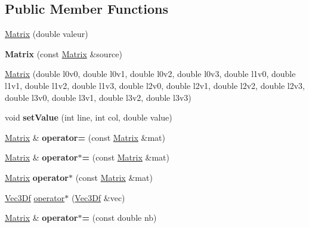 \subsection*{Public Member Functions}
\begin{DoxyCompactItemize}
\item 
\hyperlink{class_matrix_a7fc5559ca322edcad4e74748cc21a212}{Matrix} (double valeur)
\item 
\hypertarget{class_matrix_a1852c311c6669c1d7073ca79db5fced3}{
{\bfseries Matrix} (const \hyperlink{class_matrix}{Matrix} \&source)}
\label{class_matrix_a1852c311c6669c1d7073ca79db5fced3}

\item 
\hyperlink{class_matrix_aae556b9970532484d24ac438b94d9e14}{Matrix} (double l0v0, double l0v1, double l0v2, double l0v3, double l1v0, double l1v1, double l1v2, double l1v3, double l2v0, double l2v1, double l2v2, double l2v3, double l3v0, double l3v1, double l3v2, double l3v3)
\item 
\hypertarget{class_matrix_a0945de041689d520fb614b6af735ab90}{
void {\bfseries setValue} (int line, int col, double value)}
\label{class_matrix_a0945de041689d520fb614b6af735ab90}

\item 
\hypertarget{class_matrix_a3655359b1f9451cb7b589c3a9bc5c7f0}{
\hyperlink{class_matrix}{Matrix} \& {\bfseries operator=} (const \hyperlink{class_matrix}{Matrix} \&mat)}
\label{class_matrix_a3655359b1f9451cb7b589c3a9bc5c7f0}

\item 
\hypertarget{class_matrix_a51f8f6f7eca7e0a03b93d7e9594fa08b}{
\hyperlink{class_matrix}{Matrix} \& {\bfseries operator$\ast$=} (const \hyperlink{class_matrix}{Matrix} \&mat)}
\label{class_matrix_a51f8f6f7eca7e0a03b93d7e9594fa08b}

\item 
\hypertarget{class_matrix_af36b762320602082b82e7b8b7d4a93c8}{
\hyperlink{class_matrix}{Matrix} {\bfseries operator$\ast$} (const \hyperlink{class_matrix}{Matrix} \&mat)}
\label{class_matrix_af36b762320602082b82e7b8b7d4a93c8}

\item 
\hyperlink{class_vec3_d}{Vec3Df} \hyperlink{class_matrix_aba65fb54d9b60c6cc6738b45c88cada0}{operator$\ast$} (\hyperlink{class_vec3_d}{Vec3Df} \&vec)
\item 
\hypertarget{class_matrix_a270dd27392c9508623e254e490768f73}{
\hyperlink{class_matrix}{Matrix} \& {\bfseries operator$\ast$=} (const double nb)}
\label{class_matrix_a270dd27392c9508623e254e490768f73}


\end{DoxyCompactItemize}
